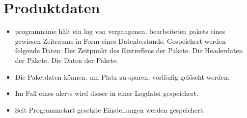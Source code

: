\chapter{Produktdaten}


\begin{itemize}
  \item \gls{programname} hält ein \gls{log} von vergangenen, bearbeiteten \glspl{paket} eines gewissen Zeitraums in Form eines Datenbestands. Gespeichert werden folgende Daten:
    \subitem Der Zeitpunkt des Eintreffens der Pakete.
    \subitem Die Headerdaten der Pakete.
    \subitem Die Daten der Pakete.
  \item Die Paketdaten können, um Platz zu sparen, vorläufig gelöscht werden.
  \item Im Fall eines \glspl{alert} wird dieser in einer Logdatei gespeichert.
  \item Seit Programmstart gesetzte Einstellungen werden gespeichert.
\end{itemize}
